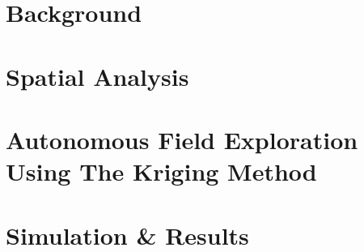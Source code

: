 \documentclass[11pt]{ucthesis}
\begin{document}



\begin{frontmatter}

\maketitle
\copyrightpage

\tableofcontents
\listoffigures

\end{frontmatter}







\part{Background}



\part{Spatial Analysis}


\part{Autonomous Field Exploration Using The Kriging Method}



\part{Simulation \& Results}




%



\nocite{*}



\appendix

\end{document}
